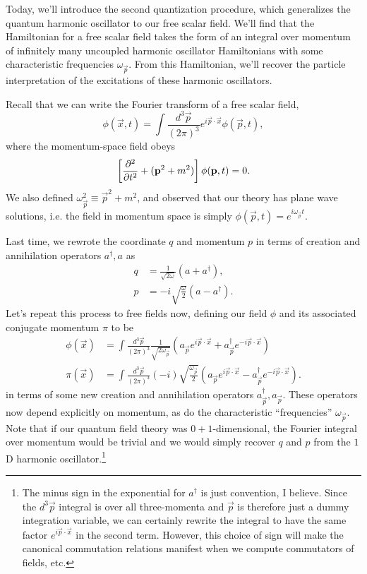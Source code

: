 Today, we'll introduce the second quantization procedure, which generalizes the quantum harmonic oscillator to our free scalar field. We'll find that the Hamiltonian for a free scalar field takes the form of an integral over momentum of infinitely many uncoupled harmonic oscillator Hamiltonians with some characteristic frequencies $\omega_{\vec p}$. From this Hamiltonian, we'll recover the particle interpretation of the excitations of these harmonic oscillators.

Recall that we can write the Fourier transform of a free scalar field, $$\phi(\vec{x},t)=\int \frac{d^3 \vec{p}}{(2\pi)^3} e^{i \vec{p}\cdot \vec{x}}\phi(\vec{p},t),$$ where the momentum-space field obeys
$$\left[\frac{\partial^2}{\partial t^2}+(\boldsymbol{\mathbf{p}}^2 +m^2)\right]\phi(\boldsymbol{\mathbf{p}},t)=0.$$
We also defined $\omega_{\vec{p}}^2\equiv \vec{p}^2 +m^2$, and observed that our theory has plane wave solutions, i.e. the field in momentum space is simply $\phi(\vec p,t)=e^{i\omega_{\vec p} t}.$

Last time, we rewrote the coordinate $q$ and momentum $p$ in terms of creation and annihilation operators $a^\dagger, a$ as
\begin{align*}
    q&=\frac{1}{\sqrt{2\omega}}(a+a^\dagger),\\
    p&=-i \sqrt{\frac{\omega}{2}}(a-a^\dagger).
\end{align*}
Let's repeat this process to free fields now, defining our field $\phi$ and its associated conjugate momentum $\pi$ to be
\begin{align}
    \phi(\vec{x})&=\int \frac{d^3 \vec{p}}{(2\pi)^3}\frac{1}{\sqrt{2\omega_{\vec p}}}(a_{\vec p}e^{i\vec{p} \cdot \vec x}+a^\dagger_{\vec p}e^{-i\vec{p} \cdot \vec x})\\
    \pi(\vec{x})&=\int \frac{d^3 \vec{p}}{(2\pi)^3}(-i)\sqrt{\frac{\omega_{\vec p}}{2}}(a_{\vec p}e^{i\vec{p} \cdot \vec x}-a^\dagger_{\vec p}e^{-i\vec{p} \cdot \vec x}).
\end{align}
in terms of some new creation and annihilation operators $a_{\vec p}^\dagger, a_{\vec p}$. These operators now depend explicitly on momentum, as do the characteristic ``frequencies'' $\omega_{\vec p}$.
Note that if our quantum field theory was $0+1$-dimensional, the Fourier integral over momentum would be trivial and we would simply recover $q$ and $p$ from the $1$D harmonic oscillator.\footnote{The minus sign in the exponential for $a^\dagger$ is just convention, I believe. Since the $d^3 \vec p$ integral is over all three-momenta and $\vec p$ is therefore just a dummy integration variable, we can certainly rewrite the integral to have the same factor $e^{i \vec p \cdot \vec x}$ in the second term. However, this choice of sign will make the canonical commutation relations manifest when we compute commutators of fields, etc.}

